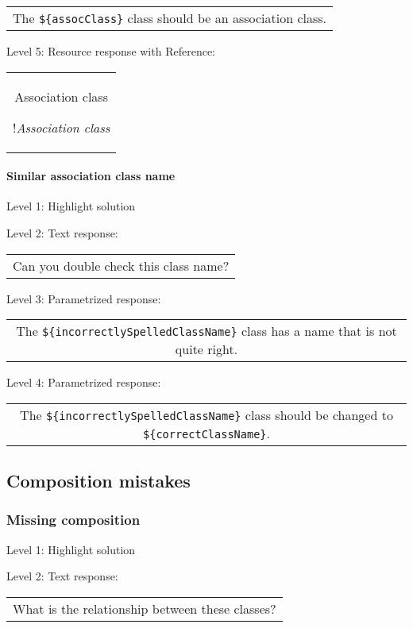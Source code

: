 \begin{tabular}{|c}
The \verb|${assocClass}| class should be an association class.
\end{tabular} \medskip

\noindent Level 5: Resource response with Reference:

\begin{tabular}{|c}
Association class

!\textit{Association class}
\end{tabular} \medskip


\paragraph{Similar association class name}

\noindent Level 1: Highlight solution \medskip

\noindent Level 2: Text response: \medskip

\begin{tabular}{|c}
Can you double check this class name?
\end{tabular} \medskip

\noindent Level 3: Parametrized response: \medskip

\begin{tabular}{|c}
The \verb|${incorrectlySpelledClassName}| class has a name that is not quite right.
\end{tabular} \medskip

\noindent Level 4: Parametrized response: \medskip

\begin{tabular}{|c}
The \verb|${incorrectlySpelledClassName}| class should be changed to \verb|${correctClassName}|.
\end{tabular} \medskip



\subsection{Composition mistakes}

\subsubsection{Missing composition}

\noindent Level 1: Highlight solution \medskip

\noindent Level 2: Text response: \medskip

\begin{tabular}{|c}
What is the relationship between these classes?
\end{tabular} \medskip

